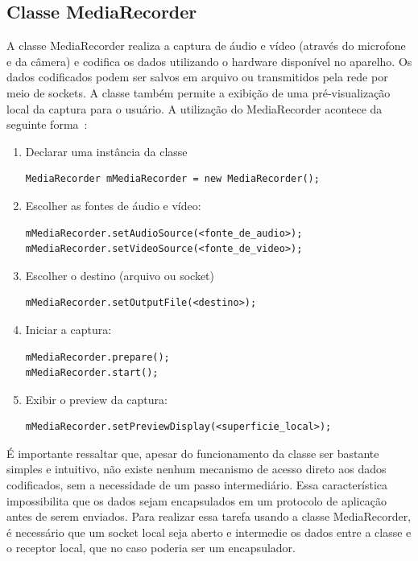 \documentclass{acm_proc_article-sp}
\begin{document}
\subsection{Classe MediaRecorder}\label{media_recorder}
A classe MediaRecorder realiza a captura de áudio e vídeo (através do microfone e da câmera) e codifica os dados utilizando o hardware disponível no aparelho. Os dados codificados podem ser salvos em arquivo ou transmitidos pela rede por meio de sockets. A classe também permite a exibição de uma pré-visualização local da captura para o usuário. A utilização do MediaRecorder acontece da seguinte forma~\cite{developers_android}:
\begin{enumerate}
 \item Declarar uma instância da classe
  \begin{lstlisting}
MediaRecorder mMediaRecorder = new MediaRecorder();
  \end{lstlisting}
 \item Escolher as fontes de áudio e vídeo:
  \begin{lstlisting}
mMediaRecorder.setAudioSource(<fonte_de_audio>);
mMediaRecorder.setVideoSource(<fonte_de_video>);
  \end{lstlisting}
 \item Escolher o destino (arquivo ou socket)
  \begin{lstlisting}
mMediaRecorder.setOutputFile(<destino>);
  \end{lstlisting}
 \item Iniciar a captura:
  \begin{lstlisting}
mMediaRecorder.prepare();
mMediaRecorder.start();
  \end{lstlisting}
 \item Exibir o preview da captura:
  \begin{lstlisting}
mMediaRecorder.setPreviewDisplay(<superficie_local>);
  \end{lstlisting}
\end{enumerate}

É importante ressaltar que, apesar do funcionamento da classe ser bastante simples e intuitivo, não existe nenhum mecanismo de acesso direto aos dados codificados, sem a necessidade de um passo intermediário. Essa característica impossibilita que os dados sejam encapsulados em um protocolo de aplicação antes de serem enviados. Para realizar essa tarefa usando a classe MediaRecorder, é necessário que um socket local seja aberto e intermedie os dados entre a classe e o receptor local, que no caso poderia ser um encapsulador.
\end{document}
